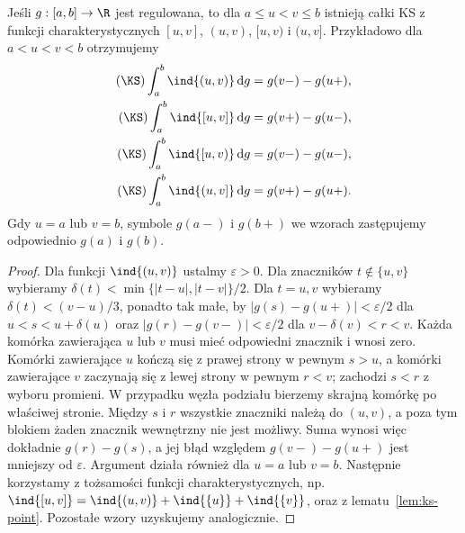 \begin{lemat}
\label{lem:ks-indicators}
Jeśli $g:[a,b]\to\R$ jest regulowana, to dla $a\le u<v\le b$ istnieją całki KS z funkcji charakterystycznych $[u,v]$, $(u,v)$, $[u,v)$ i $(u,v]$. Przykładowo dla $a<u<v<b$ otrzymujemy
\[
 \begin{aligned}
 (\KS)\int_a^b\ind{(u,v)}\,\mathrm dg&=g(v-)-g(u+),\\
 (\KS)\int_a^b\ind{[u,v]}\,\mathrm dg&=g(v+)-g(u-),\\
 (\KS)\int_a^b\ind{[u,v)}\,\mathrm dg&=g(v-)-g(u-),\\
 (\KS)\int_a^b\ind{(u,v]}\,\mathrm dg&=g(v+)-g(u+).
 \end{aligned}
\]
Gdy $u=a$ lub $v=b$, symbole $g(a-)$ i $g(b+)$ we wzorach zastępujemy odpowiednio $g(a)$ i $g(b)$.
\end{lemat}
\begin{proof}
Dla funkcji $\ind{(u,v)}$ ustalmy $\varepsilon>0$. Dla znaczników $t\notin\{u,v\}$ wybieramy $\delta(t)<\min\{|t-u|,|t-v|\}/2$. Dla $t=u,v$ wybieramy $\delta(t)<(v-u)/3$, ponadto tak małe, by $|g(s)-g(u+)|<\varepsilon/2$ dla $u<s<u+\delta(u)$ oraz $|g(r)-g(v-)|<\varepsilon/2$ dla $v-\delta(v)<r<v$. Każda komórka zawierająca $u$ lub $v$ musi mieć odpowiedni znacznik i wnosi zero. Komórki zawierające $u$ kończą się z prawej strony w pewnym $s>u$, a komórki zawierające $v$ zaczynają się z lewej strony w pewnym $r<v$; zachodzi $s<r$ z wyboru promieni. W przypadku węzła podziału bierzemy skrajną komórkę po właściwej stronie. Między $s$ i $r$ wszystkie znaczniki należą do $(u,v)$, a poza tym blokiem żaden znacznik wewnętrzny nie jest możliwy. Suma wynosi więc dokładnie $g(r)-g(s)$, a jej błąd względem $g(v-)-g(u+)$ jest mniejszy od $\varepsilon$. Argument działa również dla $u=a$ lub $v=b$. Następnie korzystamy z tożsamości funkcji charakterystycznych, np. $\ind{[u,v]}=\ind{(u,v)}+\ind{\{u\}}+\ind{\{v\}}$, oraz z lematu~\ref{lem:ks-point}. Pozostałe wzory uzyskujemy analogicznie.
\end{proof}

